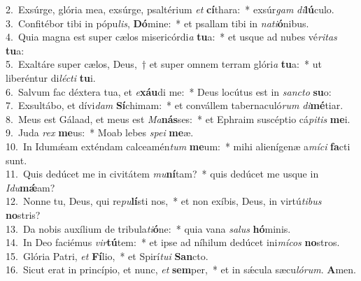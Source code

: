 {2.~}Exsúrge, glória mea, exsúrge, psaltérium \textit{et} \textbf{cí}thara:~* exsúr\textit{gam} \textit{di}\textbf{lú}culo.\\
{3.~}Confitébor tibi in pópu\textit{lis}, \textbf{Dó}mine:~* et psallam tibi in \textit{na}\textit{ti}\textbf{ó}nibus.\\
{4.~}Quia magna est super cælos misericórdi\textit{a} \textbf{tu}a:~* et usque ad nubes vé\textit{ri}\textit{tas} \textbf{tu}a:\\
{5.~}Exaltáre super cælos, Deus,~† et super omnem terram glóri\textit{a} \textbf{tu}a:~* ut liberéntur di\textit{lé}\textit{cti} \textbf{tu}i.\\
{6.~}Salvum fac déxtera tua, et \textit{e}\textbf{xáu}di me:~* Deus locútus est in \textit{san}\textit{cto} \textbf{su}o:\\
{7.~}Exsultábo, et dívi\textit{dam} \textbf{Sí}chimam:~* et convállem tabernaculó\textit{rum} \textit{di}\textbf{mé}tiar.\\
{8.~}Meus est Gálaad, et meus est \textit{Ma}\textbf{nás}ses:~* et Ephraim suscéptio cá\textit{pi}\textit{tis} \textbf{me}i.\\
{9.~}Juda \textit{rex} \textbf{me}us:~* Moab lebes \textit{spe}\textit{i} \textbf{me}æ.\\
{10.~}In Idumǽam exténdam calceamén\textit{tum} \textbf{me}um:~* mihi alienígenæ a\textit{mí}\textit{ci} \textbf{fa}cti sunt.\\
{11.~}Quis dedúcet me in civitátem \textit{mu}\textbf{ní}tam?~* quis dedúcet me usque in \textit{I}\textit{du}\textbf{mǽ}am?\\
{12.~}Nonne tu, Deus, qui re\textit{pu}\textbf{lí}sti nos,~* et non exíbis, Deus, in virtú\textit{ti}\textit{bus} \textbf{no}stris?\\
{13.~}Da nobis auxílium de tribula\textit{ti}\textbf{ó}ne:~* quia vana \textit{sa}\textit{lus} \textbf{hó}minis.\\
{14.~}In Deo faciémus \textit{vir}\textbf{tú}tem:~* et ipse ad níhilum dedúcet ini\textit{mí}\textit{cos} \textbf{no}stros.\\
{15.~}Glória Patri, \textit{et} \textbf{Fí}lio,~* et Spirí\textit{tu}\textit{i} \textbf{San}cto.\\
{16.~}Sicut erat in princípio, et nunc, \textit{et} \textbf{sem}per,~* et in sǽcula sæcu\textit{ló}\textit{rum}. \textbf{A}men.\\
